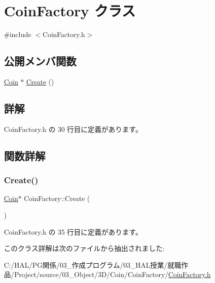 \hypertarget{class_coin_factory}{}\section{Coin\+Factory クラス}
\label{class_coin_factory}


{\ttfamily \#include $<$Coin\+Factory.\+h$>$}

\subsection*{公開メンバ関数}
\begin{DoxyCompactItemize}
\item 
\mbox{\hyperlink{class_coin}{Coin}} $\ast$ \mbox{\hyperlink{class_coin_factory_a0d2390aa7215c9802edabfe11ab62006}{Create}} ()
\end{DoxyCompactItemize}


\subsection{詳解}


 Coin\+Factory.\+h の 30 行目に定義があります。



\subsection{関数詳解}
\mbox{\label{class_coin_factory_a0d2390aa7215c9802edabfe11ab62006}} 
\subsubsection{\texorpdfstring{Create()}{Create()}}
{\footnotesize\ttfamily \mbox{\hyperlink{class_coin}{Coin}}$\ast$ Coin\+Factory\+::\+Create (\begin{DoxyParamCaption}{ }\end{DoxyParamCaption})\hspace{0.3cm}{\ttfamily [inline]}}



 Coin\+Factory.\+h の 35 行目に定義があります。



このクラス詳解は次のファイルから抽出されました\+:\begin{DoxyCompactItemize}
\item 
C\+:/\+H\+A\+L/\+P\+G関係/03\+\_\+作成プログラム/03\+\_\+\+H\+A\+L授業/就職作品/\+Project/source/03\+\_\+\+Object/3\+D/\+Coin/\+Coin\+Factory/\mbox{\hyperlink{_coin_factory_8h}{Coin\+Factory.\+h}}\end{DoxyCompactItemize}

